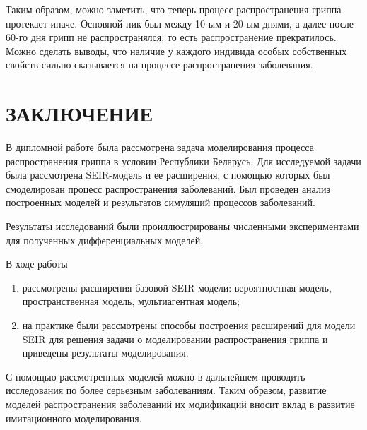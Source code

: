 \documentclass[a4paper, 14pt]{extreport}
\begin{document}
	Таким образом, можно заметить, что теперь процесс распространения гриппа протекает иначе. Основной пик был между 10-ым и 20-ым днями, а далее после 60-го дня грипп не распространялся, то есть распространение прекратилось. Можно сделать выводы, что наличие у каждого индивида особых собственных свойств сильно сказывается на процессе распространения заболевания.
	
	
	\chapter*{ЗАКЛЮЧЕНИЕ}
	В дипломной работе была рассмотрена задача моделирования процесса распространения гриппа в условии Республики Беларусь. Для исследуемой задачи была рассмотрена SEIR-модель и ее расширения, с помощью которых был смоделирован процесс распространения заболеваний. Был проведен анализ построенных моделей и результатов симуляций процессов заболеваний. 
	
	Результаты исследований были проиллюстрированы численными экспериментами для полученных дифференциальных моделей. 
	
	В ходе работы
	\begin{enumerate}
		\item рассмотрены расширения базовой SEIR модели: вероятностная модель, пространственная модель, мультиагентная модель;
		\item на практике были рассмотрены способы построения расширений для модели SEIR для решения задачи о моделировании распространения гриппа и приведены результаты моделирования.
	\end{enumerate}
	
	С помощью рассмотренных моделей можно в дальнейшем проводить исследования по более серьезным заболеваниям. Таким образом, развитие моделей распространения заболеваний их модификаций вносит вклад в развитие имитационного моделирования.
	
	
\end{document}
